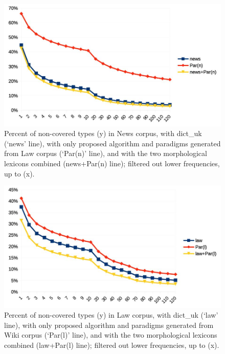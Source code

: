 \documentclass[11pt,a4paper]{article}
\begin{document}
\begin{figure}
	\includegraphics[width=\linewidth]{evaluation-coverage-newsL.jpg}
	\caption{Percent of non-covered types (y) in News corpus, with dict\_uk (`news' line), with only proposed algorithm and paradigms generated from Law corpus (`Par(n)' line), and with the two morphological lexicons combined (news+Par(n) line); filtered out lower frequencies, up to (x).}
	\label{fig:pcNoTypNewsL}
\end{figure}


\begin{figure}
	\includegraphics[width=\linewidth]{evaluation-coverage-lawW.jpg}
	\caption{Percent of non-covered types (y) in Law corpus, with dict\_uk (`law' line), with only proposed algorithm and paradigms generated from Wiki corpus (`Par(l)' line), and with the two morphological lexicons combined (law+Par(l) line); filtered out lower frequencies, up to (x).}
	\label{fig:pcNoTypLawW}
\end{figure}
\end{document}
